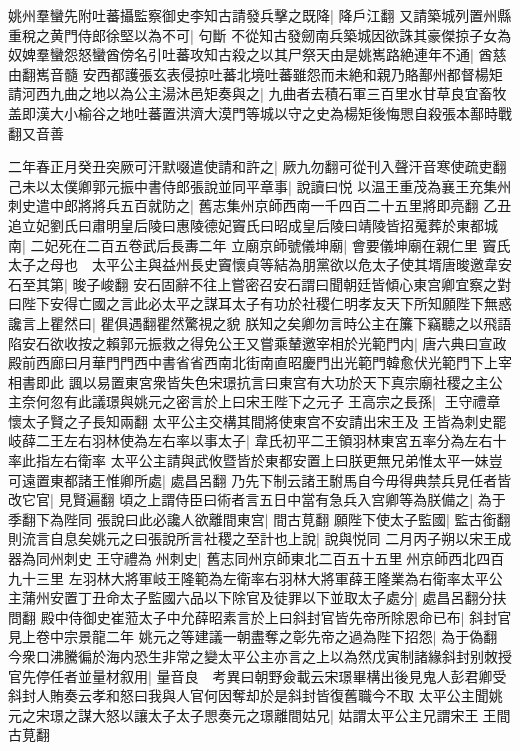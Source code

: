 姚州羣蠻先附吐蕃攝監察御史李知古請發兵擊之既降|{
	降戶江翻}
又請築城列置州縣重稅之黄門侍郎徐堅以為不可|{
	句斷}
不從知古發劒南兵築城因欲誅其豪傑掠子女為奴婢羣蠻怨怒蠻酋傍名引吐蕃攻知古殺之以其尸祭天由是姚嶲路絶連年不通|{
	酋慈由翻嶲音髓}
安西都護張玄表侵掠吐蕃北境吐蕃雖怨而未絶和親乃賂鄯州都督楊矩請河西九曲之地以為公主湯沐邑矩奏與之|{
	九曲者去積石軍三百里水甘草良宜畜牧盖即漢大小榆谷之地吐蕃置洪濟大漠門等城以守之史為楊矩後悔愳自殺張本鄯時戰翻又音善}


二年春正月癸丑突厥可汗默啜遣使請和許之|{
	厥九勿翻可從刊入聲汗音寒使疏吏翻}
己未以太僕卿郭元振中書侍郎張說並同平章事|{
	說讀曰悦}
以温王重茂為襄王充集州刺史遣中郎將將兵五百就防之|{
	舊志集州京師西南一千四百二十五里將即亮翻}
乙丑追立妃劉氏曰肅明皇后陵曰惠陵德妃竇氏曰昭成皇后陵曰靖陵皆招䰟葬於東都城南|{
	二妃死在二百五卷武后長夀二年}
立廟京師號儀坤廟|{
	會要儀坤廟在親仁里}
竇氏太子之母也　太平公主與益州長史竇懷貞等結為朋黨欲以危太子使其壻唐晙邀韋安石至其第|{
	晙子峻翻}
安石固辭不往上嘗密召安石謂曰聞朝廷皆傾心東宫卿宜察之對曰陛下安得亡國之言此必太平之謀耳太子有功於社稷仁明孝友天下所知願陛下無惑讒言上瞿然曰|{
	瞿俱遇翻瞿然驚視之貌}
朕知之矣卿勿言時公主在簾下竊聽之以飛語陷安石欲收按之賴郭元振救之得免公王又嘗乘輦邀宰相於光範門内|{
	唐六典曰宣政殿前西廊曰月華門門西中書省省西南北街南直昭慶門出光範門韓愈伏光範門下上宰相書即此}
諷以易置東宮衆皆失色宋璟抗言曰東宫有大功於天下真宗廟社稷之主公主奈何忽有此議璟與姚元之密言於上曰宋王陛下之元子王高宗之長孫|{
	王守禮章懷太子賢之子長知兩翻}
太平公主交構其間將使東宫不安請出宋王及王皆為刺史罷岐薛二王左右羽林使為左右率以事太子|{
	韋氏初平二王領羽林東宮五率分為左右十率此指左右衛率}
太平公主請與武攸暨皆於東都安置上曰朕更無兄弟惟太平一妹豈可遠置東都諸王惟卿所處|{
	處昌呂翻}
乃先下制云諸王駙馬自今毋得典禁兵見任者皆改它官|{
	見賢遍翻}
頃之上謂侍臣曰術者言五日中當有急兵入宫卿等為朕備之|{
	為于季翻下為陛同}
張說曰此必讒人欲離間東宫|{
	間古莧翻}
願陛下使太子監國|{
	監古銜翻}
則流言自息矣姚元之曰張說所言社稷之至計也上說|{
	說與悦同}
二月丙子朔以宋王成器為同州刺史王守禮為州刺史|{
	舊志同州京師東北二百五十五里州京師西北四百九十三里}
左羽林大將軍岐王隆範為左衛率右羽林大將軍薛王隆業為右衛率太平公主蒲州安置丁丑命太子監國六品以下除官及徒罪以下並取太子處分|{
	處昌呂翻分扶問翻}
殿中侍御史崔蒞太子中允薛昭素言於上曰斜封官皆先帝所除恩命已布|{
	斜封官見上卷中宗景龍二年}
姚元之等建議一朝盡奪之彰先帝之過為陛下招怨|{
	為于偽翻}
今衆口沸騰徧於海内恐生非常之變太平公主亦言之上以為然戊寅制諸緣斜封别敇授官先停任者並量材叙用|{
	量音良　考異曰朝野僉載云宋璟畢構出後見鬼人彭君卿受斜封人賄奏云孝和怒曰我與人官何因奪却於是斜封皆復舊職今不取}
太平公主聞姚元之宋璟之謀大怒以讓太子太子愳奏元之璟離間姑兄|{
	姑謂太平公主兄謂宋王王間古莧翻}
